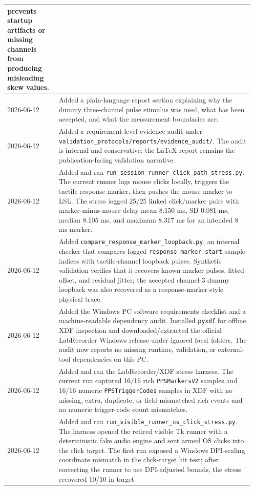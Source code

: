 \documentclass[11pt]{article}
\begin{document}
\begin{longtable}{|p{}|p{}|}
prevents startup artifacts or missing channels from producing misleading skew
values. \\
\hline
2026-06-12 & Added a plain-language report section explaining why the dummy
three-channel pulse stimulus was used, what has been accepted, and what the
measurement boundaries are. \\
\hline
2026-06-12 & Added a requirement-level evidence audit under
\texttt{validation\_protocols/reports/evidence\_audit/}. The audit is internal
and conservative; the LaTeX report remains the publication-facing validation
narrative. \\
\hline
2026-06-12 & Added and ran
\texttt{run\_session\_runner\_click\_path\_stress.py}. The current runner
logs mouse clicks locally, triggers the tactile response marker, then pushes
the mouse marker to LSL. The stress logged 25/25 linked click/marker pairs with
marker-minus-mouse delay mean 8.150 ms, SD 0.081 ms, median 8.105 ms, and
maximum 8.317 ms for an intended 8 ms marker. \\
\hline
2026-06-12 & Added
\texttt{compare\_response\_marker\_loopback.py}, an internal checker that
compares logged \texttt{response\_marker\_start} sample indices with
tactile-channel loopback pulses. Synthetic validation verifies that it recovers
known marker pulses, fitted offset, and residual jitter; the accepted
channel-3 dummy loopback was also recovered as a response-marker-style physical
trace. \\
\hline
2026-06-12 & Added the Windows PC software requirements checklist and a
machine-readable dependency audit. Installed \texttt{pyxdf} for offline XDF
inspection and downloaded/extracted the official LabRecorder Windows release
under ignored local folders. The audit now reports no missing runtime,
validation, or external-tool dependencies on this PC. \\
\hline
2026-06-12 & Added and ran the LabRecorder/XDF stress harness. The current run
captured 16/16 rich \texttt{PPSMarkersV2} samples and 16/16 numeric
\texttt{PPSTriggerCodes} samples in XDF with no missing, extra, duplicate, or
field-mismatched rich events and no numeric trigger-code count mismatches. \\
\hline
2026-06-12 & Added and ran
\texttt{run\_visible\_runner\_os\_click\_stress.py}. The harness opened the
retired visible Tk runner with a deterministic fake audio engine and sent armed
OS clicks into the click target. The first run exposed a Windows
DPI-scaling coordinate mismatch in the click-target hit test; after correcting
the runner to use DPI-adjusted bounds, the stress recovered 10/10 in-target

\end{longtable}
\end{document}
